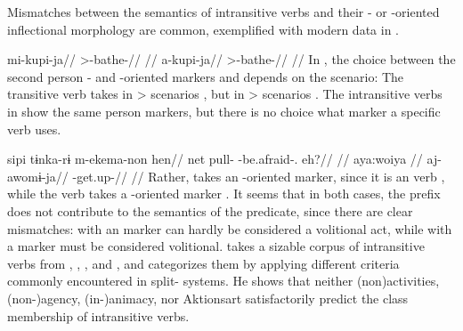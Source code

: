 

Mismatches between the semantics of intransitive verbs and their - or -oriented inflectional morphology are common, exemplified with modern \kalina data in .

 \kalina
{}
\begingl
\gla mi-kupi-ja//
\glb {}>-bathe-//
\glft {} \parencite[][160]{hoff1968carib}//
\endgl
{}
\begingl
\gla a-kupi-ja//
\glb {}>-bathe-//
\glft {} \parencite[][63]{yamada2011evidentiality}//
\endgl
\xe
%
In , the choice between the second person - and -oriented markers  and  depends on the scenario:
The transitive verb   takes  in > scenarios , but  in > scenarios .
The intransitive verbs in  show the same person markers, but there is no choice what marker a specific verb uses.

 \kalina
{}
\begingl
\gla sipi tɨnka-rɨ m-ekema-non hen//
\glb net pull- -be.afraid-. eh?//
\glft {} \parencite[][253]{courtz2008carib}//
\endgl
{}
\begingl
\glpreamble aya:woiya //
\gla aj-awomɨ-ja//
\glb {}-get.up-//
\glft {} \parencite[][167]{hoff1968carib}//
\endgl
\xe
%
Rather,   takes an -oriented marker, since it is an  verb , while the  verb   takes a -oriented marker .
It seems that in both cases, the prefix does not contribute to the semantics of the predicate, since there are clear mismatches:
 with an  marker can hardly be considered a volitional act, while   with a  marker must be considered volitional.
\textcite{meira2000split} takes a sizable corpus of intransitive verbs from \trio, \kalina, \apalai, and \wayana, and categorizes them by applying different criteria commonly encountered in split- systems.
He shows that neither (non\-)activities, %
(non-)agency, %
(in-)animacy, %
nor Aktionsart %
satisfactorily predict the class membership of intransitive verbs.

